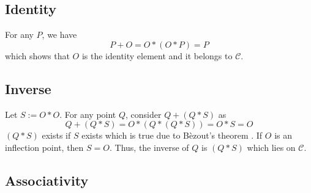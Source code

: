 \subsection*{Identity}
For any $P$, we have
\[P+O = O*(O*P) = P\]
which shows that $O$ is the identity element and it belongs to $\mathcal{C}$.

\subsection*{Inverse}
Let $S:=O*O$. For any point $Q$, consider $Q+(Q*S)$ as
\[Q+(Q*S) = O*(Q*(Q*S)) = O*S = O\]
$(Q*S)$ exists if $S$ exists which is true due to B\`ezout's theorem \cite[Thm.~A.1]{silver}.
If $O$ is an inflection point, then $S = O$.
Thus, the inverse of $Q$ is $(Q*S)$ which lies on $\mathcal{C}$.

\subsection*{Associativity}

